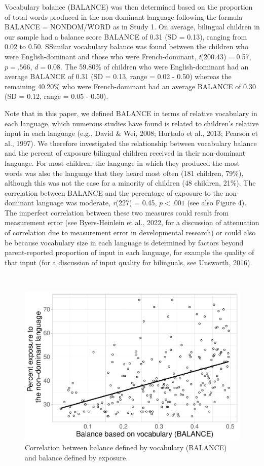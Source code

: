 \documentclass[
  english,
  ,man,floatsintext]{apa6}
\begin{document}
Vocabulary balance (BALANCE) was then determined based on the proportion of total words produced in the non-dominant language following the formula BALANCE = NONDOM/WORD as in Study 1. On average, bilingual children in our sample had a balance score BALANCE of 0.31 (SD = 0.13), ranging from 0.02 to 0.50. SSimilar vocabulary balance was found between the children who were English-dominant and those who were French-dominant, \emph{t}(200.43) = 0.57, \(p = .566\), \(d = 0.08\). The 59.80\% of children who were English-dominant had an average BALANCE of 0.31 (SD = 0.13, range = 0.02 - 0.50) whereas the remaining 40.20\% who were French-dominant had an average BALANCE of 0.30 (SD = 0.12, range = 0.05 - 0.50).

Note that in this paper, we defined BALANCE in terms of relative vocabulary in each language, which numerous studies have found is related to children's relative input in each language (e.g., David \& Wei, 2008; Hurtado et al., 2013; Pearson et al., 1997). We therefore investigated the relationship between vocabulary balance and the percent of exposure bilingual children received in their non-dominant language. For most children, the language in which they produced the most words was also the language that they heard most often (181 children, 79\%), although this was not the case for a minority of children (48 children, 21\%). The correlation between BALANCE and the percentage of exposure to the non-dominant language was moderate, \emph{r}(227) = 0.45, \(p < .001\) (see also Figure 4). The imperfect correlation between these two measures could result from measurement error (see Byers-Heinlein et al., 2022, for a discussion of attenuation of correlation due to measurement error in developmental research) or could also be because vocabulary size in each language is determined by factors beyond parent-reported proportion of input in each language, for example the quality of that input (for a discussion of input quality for bilinguals, see Unsworth, 2016).

~

\begin{figure}[H]

{\centering \includegraphics[width=0.75\linewidth]{paper_TE_bilingual_vocabulary_model_files/figure-latex/fig4-1} 

}

\caption{Correlation between balance defined by vocabulary (BALANCE) and balance defined by exposure.}\label{fig:fig4}
\end{figure}
\end{document}
